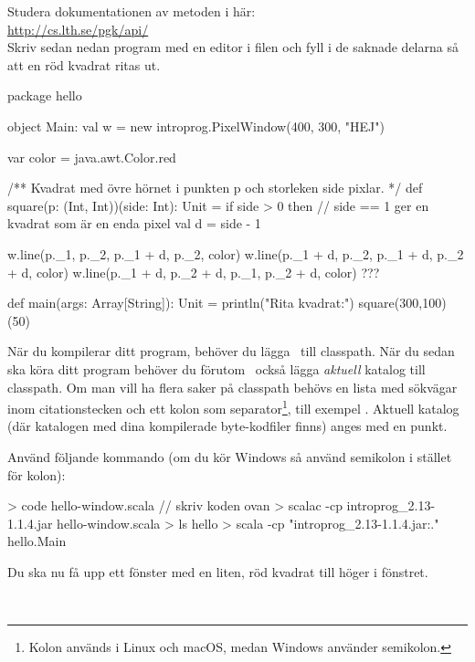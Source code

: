 \Subtask Studera dokumentationen av metoden  i  här:\\ \url{http://cs.lth.se/pgk/api/}
\\ Skriv sedan nedan program med en editor i filen  och fyll i de saknade delarna så att en röd kvadrat ritas ut.

\begin{Code}
package hello

object Main:
  val w = new introprog.PixelWindow(400, 300, "HEJ")

  var color = java.awt.Color.red

  /** Kvadrat med övre hörnet i punkten p och storleken side pixlar. */
  def square(p: (Int, Int))(side: Int): Unit =
    if side > 0 then
      // side == 1 ger en kvadrat som är en enda pixel
      val d = side - 1  

      w.line(p._1,     p._2,     p._1 + d, p._2,     color)
      w.line(p._1 + d, p._2,     p._1 + d, p._2 + d, color)
      w.line(p._1 + d, p._2 + d, p._1,     p._2 + d, color)
      ???

  def main(args: Array[String]): Unit =
    println("Rita kvadrat:")
    square(300,100)(50)
\end{Code}

\noindent
När du kompilerar ditt program, behöver du lägga \LibJar~till classpath.
När du sedan ska köra ditt program behöver du förutom  \LibJar~också lägga \emph{aktuell} katalog till classpath. Om man vill ha flera saker på classpath behövs en lista med sökvägar inom citationstecken och ett kolon som separator\footnote{Kolon används i Linux och macOS, medan Windows använder semikolon.}, till exempel .
Aktuell katalog (där katalogen  med dina kompilerade byte-kodfiler finns) anges med en punkt.

Använd följande kommando (om du kör Windows så använd semikolon i stället för kolon):
\begin{REPL}
> code hello-window.scala  // skriv koden ovan
> scalac -cp introprog_2.13-1.1.4.jar hello-window.scala
> ls hello
> scala -cp "introprog_2.13-1.1.4.jar:." hello.Main
\end{REPL}
\noindent Du ska nu få upp ett fönster med en liten, röd kvadrat till höger i fönstret.


\SOLUTION

\TaskSolved \what~

